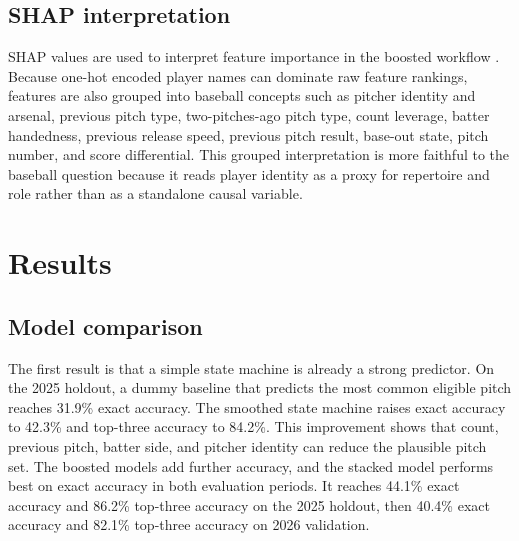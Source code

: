 \documentclass[9pt,twoside]{pnas-new}
\begin{document}
\subsection*{SHAP interpretation}

SHAP values are used to interpret feature importance in the boosted workflow \cite{lundberg2017unified}. Because one-hot encoded player names can dominate raw feature rankings, features are also grouped into baseball concepts such as pitcher identity and arsenal, previous pitch type, two-pitches-ago pitch type, count leverage, batter handedness, previous release speed, previous pitch result, base-out state, pitch number, and score differential. This grouped interpretation is more faithful to the baseball question because it reads player identity as a proxy for repertoire and role rather than as a standalone causal variable.

\section*{Results}

\subsection*{Model comparison}

The first result is that a simple state machine is already a strong predictor. On the 2025 holdout, a dummy baseline that predicts the most common eligible pitch reaches 31.9\% exact accuracy. The smoothed state machine raises exact accuracy to 42.3\% and top-three accuracy to 84.2\%. This improvement shows that count, previous pitch, batter side, and pitcher identity can reduce the plausible pitch set. The boosted models add further accuracy, and the stacked model performs best on exact accuracy in both evaluation periods. It reaches 44.1\% exact accuracy and 86.2\% top-three accuracy on the 2025 holdout, then 40.4\% exact accuracy and 82.1\% top-three accuracy on 2026 validation.
\end{document}
